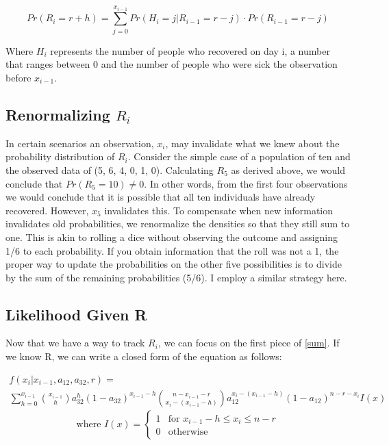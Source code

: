 \documentclass{svproc}
\begin{document}
\begin{equation}
Pr(R_i = r + h) = \sum_{j=0}^{x_{i-1}} Pr(H_i=j|R_{i-1}=r-j)\cdot Pr(R_{i-1}=r-j)
\end{equation}

Where $H_i$ represents the number of people who recovered on day i, a number that ranges between 0 and the number of people who were sick the observation before $x_{i-1}$.

\subsection*{Renormalizing $R_i$}
In certain scenarios an observation, $x_i$, may invalidate what we knew about the probability distribution of $R_i$. Consider the simple case of a population of ten and the observed data of (5, 6, 4, 0, 1, 0). Calculating $R_5$ as derived above, we would conclude that $Pr(R_5 =10)\neq 0$. In other words, from the first four observations we would conclude that it is possible that all ten individuals have already recovered. However, $x_5$ invalidates this. To compensate when new information invalidates old  probabilities, we renormalize the densities so that they still sum to one. This is akin to rolling a dice without observing the outcome and assigning 1/6 to each probability. If you obtain information that the roll was not a 1, the proper way to update the probabilities on the other five possibilities is to divide by the sum of the remaining probabilities (5/6). I employ a similar strategy here.

\subsection*{Likelihood Given R}
Now that we have a way to track $R_i$, we can focus on the first piece of \eqref{sum}. If we know R, we can write a closed form of the equation as follows:

\begin{multline}
f(x_i|x_{i-1}, a_{12}, a_{32}, r) = \\ \sum_{h=0}^{x_{i-1}}       {{x_{i-1}}\choose{h}} a_{32}^h(1-a_{32})^{x_{i-1}-h}  {{n-x_{i-1}-r}\choose{x_i-(x_{i-1}-h)}}  a_{12}^{x_i-(x_{i-1}-h)} (1-a_{12})^{n - r - x_i}I(x)  \end{multline} $$
\text{where } I(x) = \begin{cases} 1 & \text{for } x_{i-1}-h\leq x_i\leq n-r  \\ 0 &\text{otherwise} \end{cases}$$
\end{document}
